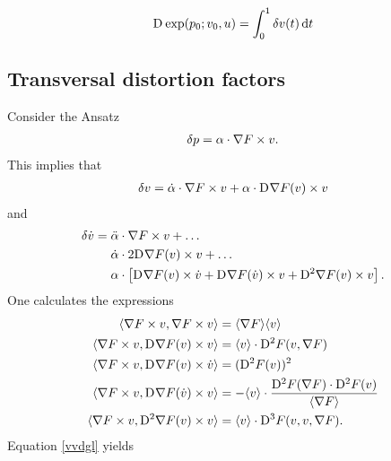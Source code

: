 \begin{align}
\mathrm{D}^{  } \exp( p_0; v_0, u )  =  \int^1_0 \delta v( t ) \,\mathrm{ d }{  t  }
\end{align}


\subsection{Transversal distortion factors}


Consider the Ansatz
\begin{align}
    \delta p  =  \alpha \cdot \nabla F  \times v .
\end{align}
This implies that
\begin{align}
    \delta v  =
    \dot{ \alpha } \cdot \nabla F  \times v  +
    \alpha \cdot \mathrm{D}^{  } \nabla F  ( v ) \times v
\end{align}
and
\begin{align}
    \delta \dot{ v }  &=
    \ddot{ \alpha } \mult \grad{ F } \times v  +  \dots\nonumber\\
    &\hphantom{{}={}}\dot{ \alpha } \mult 2 \diff{}{ \grad{ F } }( v ) \times v  +  \dots\nonumber\\
    &\hphantom{{}={}}\alpha \mult \left[ \diff{}{ \grad{ F } }( v ) \times \dot{ v }  +
    \diff{}{ \grad{ F } }( \dot{ v } ) \times v  +  
    \diff{ 2 }{ \grad{ F } }( v ) \times v \right] .
\end{align}
One calculates the expressions
\begin{subequations}
    \begin{align}
        \langle  \nabla F  \times v ,  \nabla F  \times v  \rangle  &=
        \langle  \nabla F   \rangle \langle  v  \rangle\\
        \langle  \nabla F  \times v ,  \mathrm{D}^{  } \nabla F  ( v ) \times v  \rangle  &=
        \langle  v  \rangle \cdot \mathrm{D}^{ 2 } F ( v, \nabla F  )\\
        \langle  \nabla F  \times v ,  \mathrm{D}^{  } \nabla F  ( v ) \times \dot{ v }  \rangle  &=
        ( \mathrm{D}^{ 2 } F ( v ) )^2\\
        \langle  \nabla F  \times v ,  \mathrm{D}^{  } \nabla F  ( \dot{ v } ) \times v  \rangle  &=
        -  \langle  v  \rangle \cdot \frac{ \mathrm{D}^{ 2 } F ( \nabla F  ) \cdot \mathrm{D}^{ 2 } F ( v ) }{ \langle  \nabla F   \rangle }\\
        \langle  \nabla F  \times v ,  \mathrm{D}^{ 2 } \nabla F  ( v ) \times v  \rangle  &=
        \langle  v  \rangle \cdot \mathrm{D}^{ 3 } F ( v, v, \nabla F  ) .
    \end{align}
\end{subequations}
Equation \eqref{vvdgl} yields
